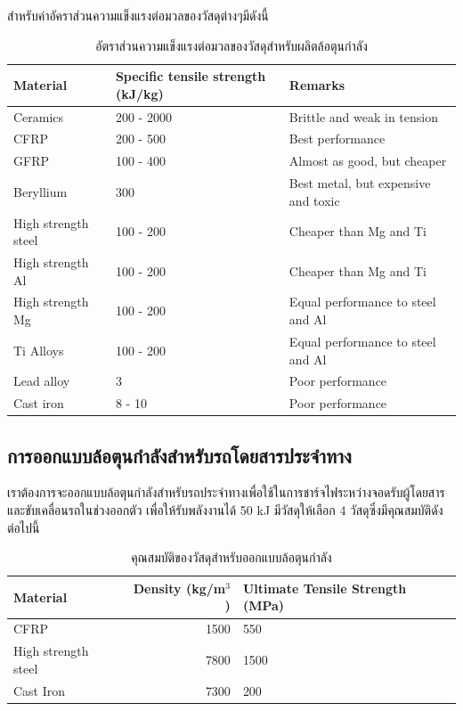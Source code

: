 \documentclass[a4paper,nobib,openany,10pt]{tufte-book}
\begin{document}
สำหรับค่าอัคราส่วนความแข็งแรงต่อมวลของวัสดุต่างๆมีดังนี้

\begin{table}[htbp]
\caption{อัตราส่วนความแข็งแรงต่อมวลของวัสดุสำหรับผลิตล้อตุนกำลัง}
\centering
\begin{tabular}{p{2.5cm}p{3cm}p{3.5cm}}
\toprule
Material & Specific tensile strength (kJ/kg) & Remarks\\
\midrule
Ceramics & 200 - 2000 & Brittle and weak in tension\\
CFRP & 200 - 500 & Best performance\\
GFRP & 100 - 400 & Almost as good, but cheaper\\
Beryllium & 300 & Best metal, but expensive and toxic\\
High strength steel & 100 - 200 & Cheaper than Mg and Ti\\
High strength Al & 100 - 200 & Cheaper than Mg and Ti\\
High strength Mg & 100 - 200 & Equal performance to steel and Al\\
Ti Alloys & 100 - 200 & Equal performance to steel and Al\\
Lead alloy & 3 & Poor performance\\
Cast iron & 8 - 10 & Poor performance\\
\bottomrule
\end{tabular}
\end{table}

\subsection{การออกแบบล้อตุนกำลังสำหรับรถโดยสารประจำทาง}
\label{sec:org2e4799f}

เราต้องการจะออกแบบล้อตุนกำลังสำหรับรถประจำทางเพื่อใช้ในการชาร์จไฟระหว่างจอดรับผู้โดยสาร
และขับเคลื่อนรถในช่วงออกตัว เพื่อให้รับพลังงานได้ 50 kJ มีวัสดุให้เลือก
4 วัสดุซึ่งมีคุณสมบัติดังต่อไปนี้

\begin{table}[htbp]
\caption{คุณสมบัติของวัสดุสำหรับออกแบบล้อตุนกำลัง}
\centering
\begin{tabular}{lrp{3cm}}
\toprule
Material & Density (kg/m\(^{\text{3}}\)) & Ultimate Tensile Strength (MPa)\\
\midrule
CFRP & 1500 & 550\\
High strength steel & 7800 & 1500\\
Cast Iron & 7300 & 200\\
\bottomrule
\end{tabular}
\end{table}
\end{document}
